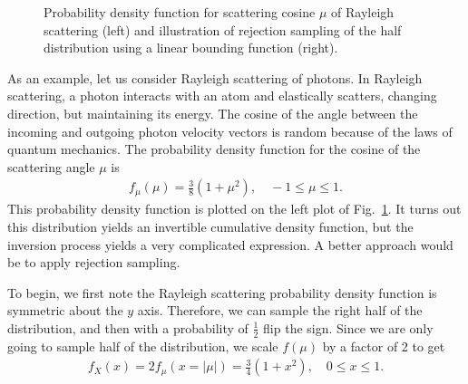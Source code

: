 \begin{figure}[tb!]
\begin{center}
\caption{Probability density function for scattering cosine $\mu$ of Rayleigh scattering (left) and illustration of rejection sampling of the half distribution using a linear bounding function (right).}
\label{Fig:probability_rejectionRayleighScatteringExample}
\end{center}
\end{figure}

As an example, let us consider Rayleigh scattering of photons. In Rayleigh scattering, a photon interacts with an atom and elastically scatters, changing direction, but maintaining its energy. The cosine of the angle between the incoming and outgoing photon velocity vectors is random because of the laws of quantum mechanics. The probability density function for the cosine of the scattering angle $\mu$ is
\begin{align}
  f_\mu(\mu) = \frac{3}{8} ( 1 + \mu^2 ), \quad -1 \le \mu \le 1 .
\end{align}
This probability density function is plotted on the left plot of Fig.~\ref{Fig:probability_rejectionRayleighScatteringExample}. It turns out this distribution yields an invertible cumulative density function, but the inversion process yields a very complicated expression. A better approach would be to apply rejection sampling.

To begin, we first note the Rayleigh scattering probability density function is symmetric about the $y$ axis. Therefore, we can sample the right half of the distribution, and then with a probability of $\tfrac{1}{2}$ flip the sign. Since we are only going to sample half of the distribution, we scale $f(\mu)$ by a factor of 2 to get
\begin{align}
  f_X(x) = 2 f_\mu(x = | \mu |) =  \frac{3}{4} ( 1 + x^2 ), \quad 0 \le x \le 1 .
\end{align}

